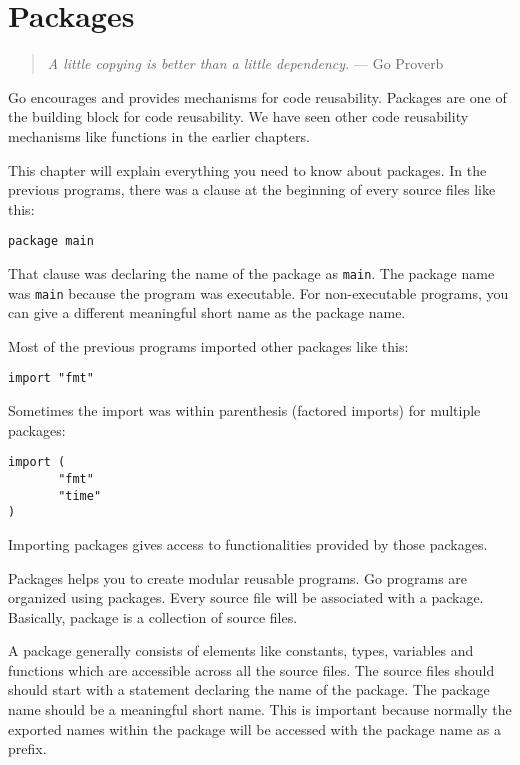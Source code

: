 \cleardoublepage
{}
\chapter{Packages}

\begin{quote}
\textit{A little copying is better than a little dependency.} --- Go Proverb
\end{quote}

Go encourages and provides mechanisms for code reusability.  Packages
are one of the building block for code reusability.  We have seen
other code reusability mechanisms like functions in the earlier
chapters.

This chapter will explain everything you need to know about
packages.  In the previous programs, there was a clause
at the beginning of every source files like this:

\begin{lstlisting}[numbers=none]
package main
\end{lstlisting}

That clause was declaring the name of the package as \texttt{main}.
The package name was \texttt{main} because the program was executable.
For non-executable programs, you can give a different meaningful short
name as the package name.

Most of the previous programs imported other packages like this:

\begin{lstlisting}[numbers=none]
import "fmt"
\end{lstlisting}

Sometimes the import was within parenthesis (factored imports) for
multiple packages:

\begin{lstlisting}[numbers=none]
import (
       "fmt"
       "time"
)
\end{lstlisting}

Importing packages gives access to functionalities provided by those
packages.

Packages helps you to create modular reusable programs.  Go programs
are organized using packages.  Every source file will be associated
with a package.  Basically, package is a collection of source files.

A package generally consists of elements like constants, types,
variables and functions which are accessible across all the source
files.  The source files should should start with a statement
declaring the name of the package.  The package name should be a
meaningful short name.  This is important because normally the
exported names within the package will be accessed with the package
name as a prefix.

